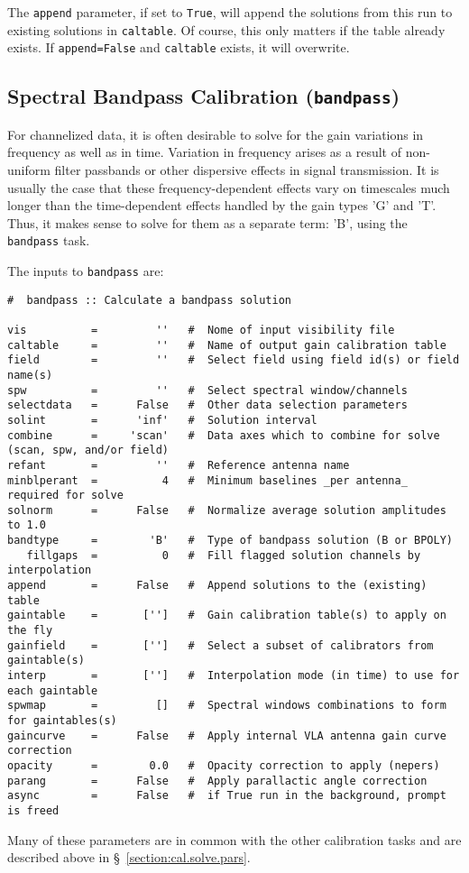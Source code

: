 The {\tt append} parameter, if set to {\tt True}, will append the
solutions from this run to existing solutions in {\tt caltable}.
Of course, this only matters if the table already exists.  If
{\tt append=False} and {\tt caltable} exists, it will overwrite.

\subsection{Spectral Bandpass Calibration ({\tt bandpass})}
\label{section:cal.solve.band}

For channelized data, it is often desirable to solve for the gain
variations in frequency as well as in time.  Variation in frequency
arises as a result of non-uniform filter passbands or other dispersive
effects in signal transmission.  It is usually the case that these
frequency-dependent effects vary on timescales much longer than the
time-dependent effects handled by the gain types 'G' and 'T'.  
Thus, it makes sense to solve for them as a separate term: 'B', using the
{\tt bandpass} task.

The inputs to {\tt bandpass} are:
\small
\begin{verbatim}
#  bandpass :: Calculate a bandpass solution

vis          =         ''   #  Nome of input visibility file
caltable     =         ''   #  Name of output gain calibration table
field        =         ''   #  Select field using field id(s) or field name(s)
spw          =         ''   #  Select spectral window/channels
selectdata   =      False   #  Other data selection parameters
solint       =      'inf'   #  Solution interval
combine      =     'scan'   #  Data axes which to combine for solve (scan, spw, and/or field)
refant       =         ''   #  Reference antenna name
minblperant  =          4   #  Minimum baselines _per antenna_ required for solve
solnorm      =      False   #  Normalize average solution amplitudes to 1.0
bandtype     =        'B'   #  Type of bandpass solution (B or BPOLY)
   fillgaps  =          0   #  Fill flagged solution channels by interpolation
append       =      False   #  Append solutions to the (existing) table
gaintable    =       ['']   #  Gain calibration table(s) to apply on the fly
gainfield    =       ['']   #  Select a subset of calibrators from gaintable(s)
interp       =       ['']   #  Interpolation mode (in time) to use for each gaintable
spwmap       =         []   #  Spectral windows combinations to form for gaintables(s)
gaincurve    =      False   #  Apply internal VLA antenna gain curve correction
opacity      =        0.0   #  Opacity correction to apply (nepers)
parang       =      False   #  Apply parallactic angle correction
async        =      False   #  if True run in the background, prompt is freed
\end{verbatim}
\normalsize
Many of these parameters are in common with the other calibration
tasks and are described above in \S~\ref{section:cal.solve.pars}.

